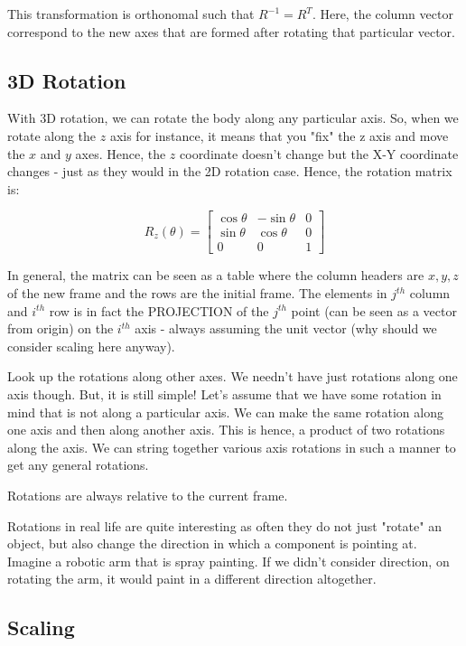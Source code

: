 This transformation is orthonomal such that $R^{-1}=R^T$. Here, the column vector correspond to the new axes that are formed after rotating that particular vector.

\subsection{3D Rotation}

With 3D rotation, we can rotate the body along any particular axis. So, when we rotate along the $z$ axis for instance, it means that you "fix" the z axis and move the $x$ and $y$ axes. Hence, the $z$ coordinate doesn't change but the X-Y coordinate changes - just as they would in the 2D rotation case. Hence, the rotation matrix is:

\begin{equation}
    R_{z}(\theta) = \begin{bmatrix} 
    \cos\theta & -\sin\theta & 0 \\
    \sin\theta & \cos\theta & 0 \\
    0 & 0 & 1
    \end{bmatrix}
\end{equation}

In general, the matrix can be seen as a table where the column headers are $x, y, z$ of the new frame and the rows are the initial frame. The elements in $j^{th}$ column and $i^{th}$ row is in fact the PROJECTION of the $j^{th}$ point (can be seen as a vector from origin) on the $i^{th}$ axis - always assuming the unit vector (why should we consider scaling here anyway).

Look up the rotations along other axes. We needn't have just rotations along one axis though. But, it is still simple! Let's assume that we have some rotation in mind that is not along a particular axis. We can make the same rotation along one axis and then along another axis. This is hence, a product of two rotations along the axis. We can string together various axis rotations in such a manner to get any general rotations. 

Rotations are always relative to the current frame.

Rotations in real life are quite interesting as often they do not just "rotate" an object, but also change the direction in which a component is pointing at. Imagine a robotic arm that is spray painting. If we didn't consider direction, on rotating the arm, it would paint in a different direction altogether.

\subsection{Scaling}

